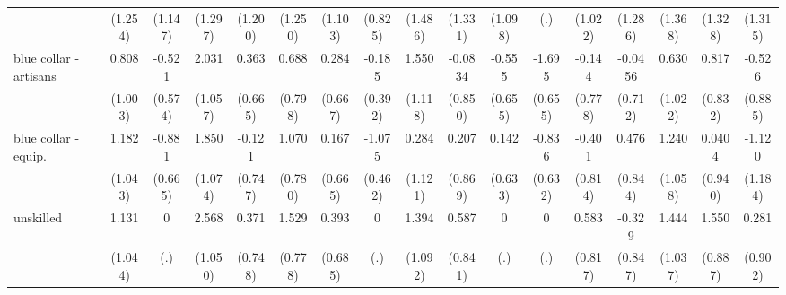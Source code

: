 {\begin{tabular}{l*{16}{c}}
                    &     (1.254)         &     (1.147)         &     (1.297)         &     (1.200)         &     (1.250)         &     (1.103)         &     (0.825)         &     (1.486)         &     (1.331)         &     (1.098)         &         (.)         &     (1.022)         &     (1.286)         &     (1.368)         &     (1.328)         &     (1.315)         \\
[1em]
blue collar - artisans&       0.808         &      -0.521         &       2.031         &       0.363         &       0.688         &       0.284         &      -0.185         &       1.550         &     -0.0834         &      -0.555         &      -1.695\sym{**} &      -0.144         &     -0.0456         &       0.630         &       0.817         &      -0.526         \\
                    &     (1.003)         &     (0.574)         &     (1.057)         &     (0.665)         &     (0.798)         &     (0.667)         &     (0.392)         &     (1.118)         &     (0.850)         &     (0.655)         &     (0.655)         &     (0.778)         &     (0.712)         &     (1.022)         &     (0.832)         &     (0.885)         \\
[1em]
blue collar - equip.&       1.182         &      -0.881         &       1.850         &      -0.121         &       1.070         &       0.167         &      -1.075\sym{*}  &       0.284         &       0.207         &       0.142         &      -0.836         &      -0.401         &       0.476         &       1.240         &      0.0404         &      -1.120         \\
                    &     (1.043)         &     (0.665)         &     (1.074)         &     (0.747)         &     (0.780)         &     (0.665)         &     (0.462)         &     (1.121)         &     (0.869)         &     (0.633)         &     (0.632)         &     (0.814)         &     (0.844)         &     (1.058)         &     (0.940)         &     (1.184)         \\
[1em]
unskilled           &       1.131         &           0         &       2.568\sym{*}  &       0.371         &       1.529\sym{*}  &       0.393         &           0         &       1.394         &       0.587         &           0         &           0         &       0.583         &      -0.329         &       1.444         &       1.550         &       0.281         \\
                    &     (1.044)         &         (.)         &     (1.050)         &     (0.748)         &     (0.778)         &     (0.685)         &         (.)         &     (1.092)         &     (0.841)         &         (.)         &         (.)         &     (0.817)         &     (0.847)         &     (1.037)         &     (0.887)         &     (0.902)         \\

\end{tabular}}
